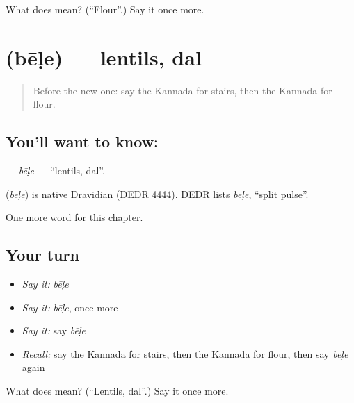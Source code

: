 \begin{tcolorbox}[breakable,colback=teal!4,colframe=teal!35!black,title={Before you move on}]
What does  mean? (\textquotedblleft{}Flour\textquotedblright{}.) Say it once more.
\end{tcolorbox}
\section[\texorpdfstring{\kn{ಬೇಳೆ} (bēḷe)}{ಬೇಳೆ (bēḷe)}]{ (bēḷe) — lentils, dal}

\label{lesson:KA-C257-bele}



\begin{quote}
Before the new one: say the Kannada for stairs, then the Kannada for flour.
\end{quote}

\subsection*{You'll want to know: }
\textbf{} — \emph{bēḷe} — \textquotedblleft{}lentils, dal\textquotedblright{}.

\begin{cousinweb}
\textbf{} (\emph{bēḷe}) is native Dravidian (DEDR 4444). DEDR lists \emph{bēḷe}, \textquotedblleft{}split pulse\textquotedblright{}.
\end{cousinweb}

\begin{grammarlens}[title={What you've built}]
One more word for this chapter.
\end{grammarlens}

\subsection*{Your turn}
\begin{itemize}
\raggedright
  \item \emph{Say it:} \emph{bēḷe}
  \item \emph{Say it:} \emph{bēḷe}, once more
  \item \emph{Say it:} say \emph{bēḷe}
  \item \emph{Recall:} say the Kannada for stairs, then the Kannada for flour, then say \emph{bēḷe} again
\end{itemize}

\begin{tcolorbox}[breakable,colback=teal!4,colframe=teal!35!black,title={Before you move on}]
What does  mean? (\textquotedblleft{}Lentils, dal\textquotedblright{}.) Say it once more.
\end{tcolorbox}
